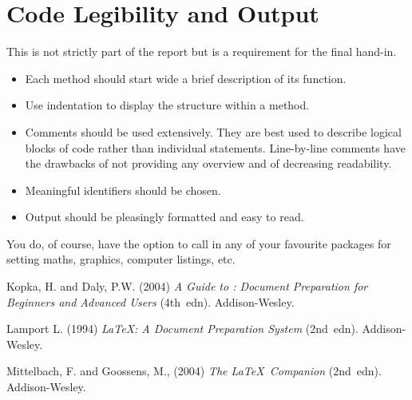 \section{Code Legibility and Output}

This is not strictly part of the report but is a requirement for the
final hand-in.

\begin{itemize}
\item Each method should start wide a brief description of its
  function.

\item Use indentation to display the structure within a method.

\item Comments should be used extensively. They are best used to
  describe logical blocks of code rather than individual
  statements. Line-by-line comments have the drawbacks of not
  providing any overview and of decreasing readability.

\item Meaningful identifiers should be chosen.

\item Output should be pleasingly formatted and easy to read.
\end{itemize}

You do, of course, have the option to call in any of your
favourite packages for setting maths, graphics, computer listings,
etc.

\begin{thebibliography}{9}

Kopka, H. and Daly, P.W.  (2004) \textit{A Guide to \LaTeXe:
Document Preparation for Beginners and Advanced Users} (4th~edn).
Addison-Wesley.

Lamport L. (1994) \textit{\LaTeX: A Document Preparation System}
(2nd~edn). Addison-Wesley.

Mittelbach, F. and Goossens, M., (2004) \textit{The \LaTeX\
Companion} (2nd~edn). Addison-Wesley.

\end{thebibliography}